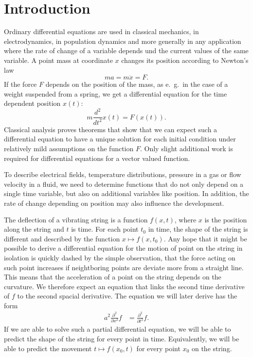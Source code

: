 %
%
%
\chapter*{Introduction}
Ordinary differential equations are used in classical mechanics,
in electrodynamics, in population dynamics and more generally in any
application where the rate of change of a variable depends und the current
values of the same variable.
A point mass at coordinate $x$ changes its position according to 
Newton's law
\[
ma=m\ddot x=F.
\]
If the force $F$ depends on the position of the mass, as e.~g.~in the
case of a weight suspended from a spring, we get a differential equation
for the time dependent position $x(t)$:
\[
m\frac{d^2}{dt^2}x(t)=F(x(t)).
\]
Classical analysis proves theorems that show that we can expect such
a differential equation to have a unique solution for each
initial condition under relatively mild assumptions on the function $F$.
Only slight additional work is required for differential equations 
for a vector valued function.

To describe electrical fields, temperature distributions, pressure
in a gas or flow velocity in a fluid, we need to determine functions 
that do not only depend on a single time variable, but also on additional
variables like position.
In addition, the rate of change depending on position may also influence
the development.

The deflection of a vibrating string is a function $f(x,t)$, where $x$ is
the position along the string and $t$ is time.
For each point $t_0$ in time, the shape of the string is different and
described by the function $x\mapsto f(x,t_0)$.
Any hope that it might be possible to derive a differential equation
for the motion of point on the string in isolation is quickly dashed
by the simple observation, that the force acting on such point
increases if neightboring points are deviate more from a straight line.
This means that the acceleration of a point on the string depends on 
the curvature.
We therefore expect an equation that links the second time derivative of $f$
to the second spacial derivative.
The equation we will later derive has the form
\begin{align*}
a^2\frac{\partial^2}{\partial x^2}f&= \frac{\partial^2}{\partial t^2}f.
\end{align*}
If we are able to solve such a partial differential equation,
we will be able to predict the shape of the string for every point in
time.
Equivalently, we will be able to predict the movement $t\mapsto f(x_0,t)$
for every point $x_0$ on the string.

